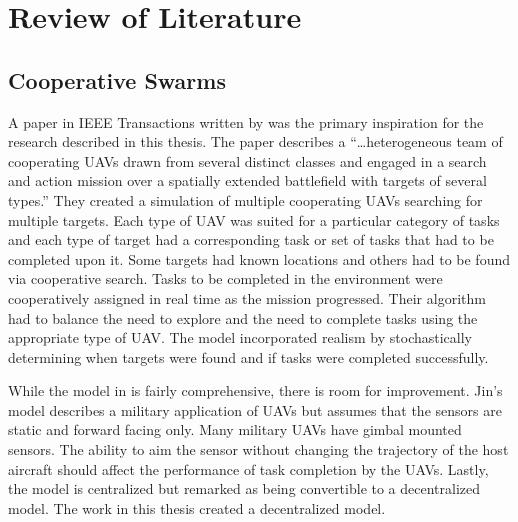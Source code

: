\chapter{Review of Literature}
\label{chap:relWork}
\section{Cooperative Swarms}

A paper in IEEE Transactions written by \citet{jin} was the primary inspiration for the research described in this thesis.  The paper describes a ``\ldots heterogeneous team of cooperating UAVs drawn from several distinct classes and engaged in a search and action mission over a spatially extended battlefield with targets of several types.'' They created a simulation of multiple cooperating UAVs searching for multiple targets.  Each type of UAV was suited for a particular category of tasks and each type of target had a corresponding task or set of tasks that had to be completed upon it.  Some targets had known locations and others had to be found via cooperative search.  Tasks to be completed in the environment were cooperatively assigned in real time as the mission progressed.  Their algorithm had to balance the need to explore and the need to complete tasks using the appropriate type of UAV.  The model incorporated realism by stochastically determining when targets were found and if tasks were completed successfully.

While the model in \citet{jin} is fairly comprehensive, there is room for improvement.  Jin's model describes a military application of UAVs but assumes that the sensors are static and forward facing only.  Many military UAVs have gimbal mounted sensors.  The ability to aim the sensor without changing the trajectory of the host aircraft should affect the performance of task completion by the UAVs.  Lastly, the model is centralized but remarked as being convertible to a decentralized model.  The work in this thesis created a decentralized model.


